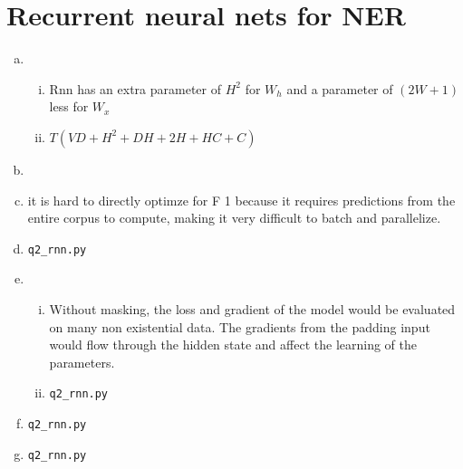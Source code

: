 \documentclass{article}[11pt]
\begin{document}
\section{Recurrent neural nets for NER}
\begin{enumerate}[(a)]
\item
  \begin{enumerate}[i.]
  \item Rnn has an extra parameter of $H^2$ for $W_{h}$ and a parameter of $(2W + 1)$ less for $W_{x}$
 \item $T(VD + H^2 + DH + 2H + HC + C)$
\end{enumerate}
 \item 
\item it is hard to directly optimze
for F 1 because it requires predictions from the entire corpus to compute, making it very
difficult to batch and parallelize. 
\item \verb|q2_rnn.py|
\item 
	\begin{enumerate}[i.]
	\item Without masking, the loss and gradient of the model would be evaluated on many non existential data. The gradients from the padding input would flow through the hidden state and affect the learning of the parameters.

\item \verb|q2_rnn.py|

\end{enumerate}
\item \verb|q2_rnn.py|
\item \verb|q2_rnn.py|


\end{enumerate}
\end{document}
